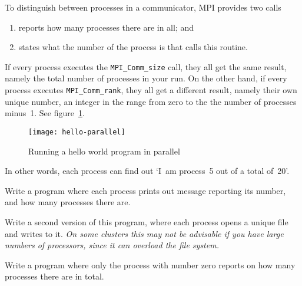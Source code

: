To distinguish between processes in a communicator, MPI provides two calls
\begin{enumerate}
\item {} reports how many processes there are in all; and
\item {} states what the number of the
  process is that calls this routine.
\end{enumerate}

If every process executes the \lstinline$MPI_Comm_size$ call, they all get the
same result, namely the total number of processes in your run.
%
%
On the
other hand, if every process executes \lstinline$MPI_Comm_rank$, they all get
a different result, namely their own unique number, an integer in the
range from zero to the the number of processes minus~1.
See figure~\ref{fig:rank-parallel}.
%
%
\begin{figure}[ht]
  \texttt{[image: hello-parallel]}
  \caption{Running a hello world program in parallel}
  \label{fig:rank-parallel}
\end{figure}
%
In other words, each process can find out `I~am process~5
out of a total of~20'.

\begin{exercise}
  \label{ex:hello3}
  Write a program where each process prints out message
  reporting its number, and how many processes there are.

  Write a second version of this program, where each process opens a
  unique file and writes to it. \emph{On some clusters this may not be
    advisable if you have large numbers of processors, since it can
    overload the file system.}
\end{exercise}

\begin{exercise}
  \label{ex:hello4}
  Write a program where only the process with number zero
  reports on how many processes there are in total.
\end{exercise}
